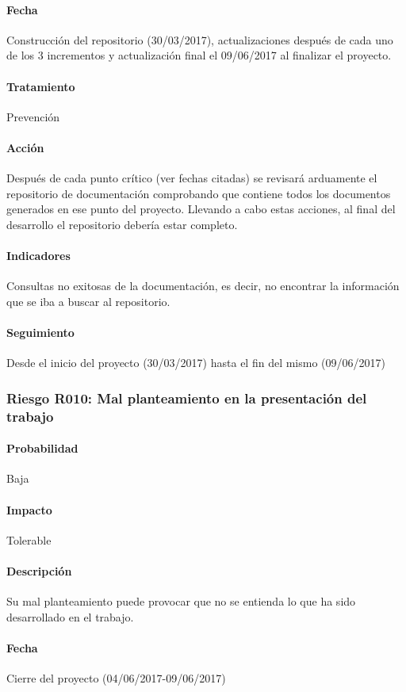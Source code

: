 \documentclass[10pt,a4paper]{article}
\begin{document}
				\paragraph{Fecha} Construcción del repositorio (30/03/2017), actualizaciones después de cada uno de los 3 incrementos y actualización final el 09/06/2017 al finalizar el proyecto.
				\paragraph{Tratamiento} Prevención
				\paragraph{Acción} Después de cada punto crítico (ver fechas citadas) se revisará arduamente el repositorio de documentación comprobando que contiene todos los documentos generados en ese punto del proyecto.	Llevando a cabo estas acciones, al final del desarrollo el repositorio debería estar completo.			
				\paragraph{Indicadores} Consultas no exitosas de la documentación, es decir, no encontrar la información que se iba a buscar al repositorio.
				\paragraph{Seguimiento}	Desde el inicio del proyecto (30/03/2017) hasta el fin del mismo (09/06/2017)
				
			\subsubsection{Riesgo R010: Mal planteamiento en la presentación del trabajo}
				\paragraph{Probabilidad} Baja
				\paragraph{Impacto}	Tolerable
				\paragraph{Descripción} Su mal planteamiento puede provocar que no se entienda lo que ha sido desarrollado en el trabajo. 
				\paragraph{Fecha} Cierre del proyecto (04/06/2017-09/06/2017)
\end{document}
